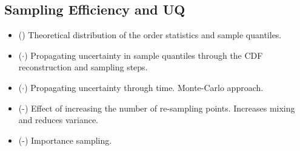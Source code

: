

\subsection{Sampling Efficiency and UQ}


\begin{itemize}
    \item (\checkmark) Theoretical distribution of the order statistics and sample quantiles.
    \item ($\cdot$) Propagating uncertainty in sample quantiles through the CDF reconstruction and sampling steps.
    \item ($\cdot$) Propagating uncertainty through time.  Monte-Carlo approach.
    \item (\checkmark-) Effect of increasing the number of re-sampling points.  Increases mixing and reduces variance.
    \item (\checkmark-) Importance sampling.
\end{itemize}
